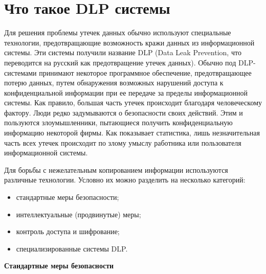 \section{Что такое DLP системы}

Для решения проблемы утечек данных обычно используют специальные технологии, предотвращающие возможность кражи данных из информационной системы. Эти системы получили название DLP (Data Leak Prevention, что переводится на русский как предотвращение утечек данных). Обычно под DLP-системами принимают некоторое программное обеспечение, предотвращающее потерю данных, путем обнаружения возможных нарушений доступа к конфиденциальной информации при ее передаче за пределы информационной системы. Как правило, большая часть утечек происходит благодаря человеческому фактору. Люди редко задумываются о безопасности своих действий. Этим и пользуются злоумышленники, пытающиеся получить конфиденциальную информацию некоторой фирмы. Как показывает статистика, лишь незначительная часть всех утечек происходит по злому умыслу работника или пользователя информационной системы.

Для борьбы с нежелательным копированием информации используются различные технологии. Условно их можно разделить на несколько категорий:

\begin{itemize}
	\item
		стандартные меры безопасности;
	\item
		интеллектуальные (продвинутые) меры;
	\item
		контроль доступа и шифрование;
	\item
		специализированные системы DLP.
\end{itemize}

\textbf{Стандартные меры безопасности}

